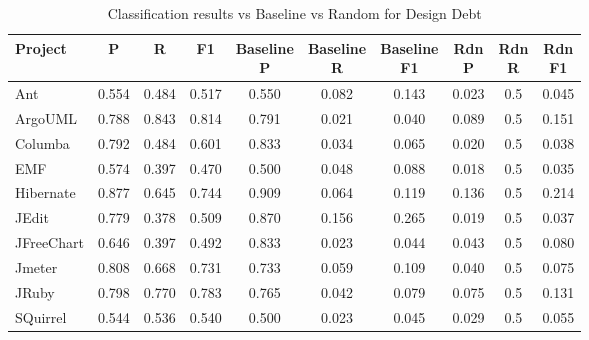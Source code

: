 \begin{table}[!hbt]
    \begin{center}
        \caption{Classification results vs Baseline vs Random for Design Debt}
        \label{tbl:classifier_results_vs_baseline_design}
        \begin{tabular}{l| c c c c c c c c c}
        \toprule
        \textbf{Project} & \textbf{P} & \textbf{R} & \textbf{F1} & \thead{Baseline\\P} & \thead{Baseline\\R} & \thead{Baseline\\F1} & \thead{Rdn\\P} & \thead{Rdn\\R} & \thead{Rdn\\F1} \\
        \midrule
        Ant           &  0.554   &  0.484  &  0.517  &   0.550   & 0.082  & 0.143  &  0.023 &  0.5 &  0.045  \\
        ArgoUML       &  0.788   &  0.843  &  0.814  &   0.791   & 0.021  & 0.040  &  0.089 &  0.5 &  0.151  \\
        Columba       &  0.792   &  0.484  &  0.601  &   0.833   & 0.034  & 0.065  &  0.020 &  0.5 &  0.038  \\
        EMF           &  0.574   &  0.397  &  0.470  &   0.500   & 0.048  & 0.088  &  0.018 &  0.5 &  0.035  \\
        Hibernate     &  0.877   &  0.645  &  0.744  &   0.909   & 0.064  & 0.119  &  0.136 &  0.5 &  0.214  \\
        JEdit         &  0.779   &  0.378  &  0.509  &   0.870   & 0.156  & 0.265  &  0.019 &  0.5 &  0.037  \\
        JFreeChart    &  0.646   &  0.397  &  0.492  &   0.833   & 0.023  & 0.044  &  0.043 &  0.5 &  0.080  \\
        Jmeter        &  0.808   &  0.668  &  0.731  &   0.733   & 0.059  & 0.109  &  0.040 &  0.5 &  0.075  \\
        JRuby         &  0.798   &  0.770  &  0.783  &   0.765   & 0.042  & 0.079  &  0.075 &  0.5 &  0.131  \\
        SQuirrel      &  0.544   &  0.536  &  0.540  &   0.500   & 0.023  & 0.045  &  0.029 &  0.5 &  0.055  \\
        \bottomrule
        \end{tabular}
    \end{center}    
\end{table}
                 

